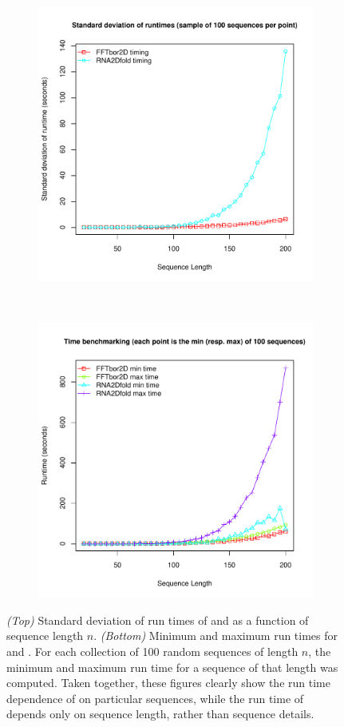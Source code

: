 \begin{figure}[!ht]
\centering
\begin{subfigure}[h]{\textwidth}
\centering
\includegraphics[width=.65\textwidth]{Figures/FFTbor2D/ffttwoRtwofoldStdev.pdf}
\end{subfigure} \\
\begin{subfigure}[h]{\textwidth}
\centering
\includegraphics[width=.65\textwidth]{Figures/FFTbor2D/ffttwoRtwofoldMinMax.pdf}
\end{subfigure}
\caption{
{\em (Top)}
Standard deviation of run times of \rnatwofold and \ffttwo
as a function of sequence length $n$.
{\em (Bottom)}
Minimum and maximum run times for \rnatwofold and \ffttwo.
For each collection of 100 random sequences of length $n$, the minimum
and maximum run time for a sequence of that length was computed.
Taken together, these figures clearly show the
run time dependence of \rnatwofold on particular sequences, while
the run time of \ffttwo depends only on sequence length, rather than
sequence details.
}
\label{fig:ffttwo:ffttwoRtwofoldStdevMinMax}
\end{figure}


